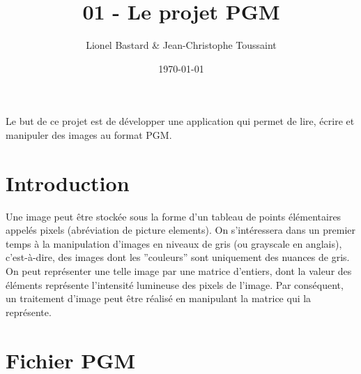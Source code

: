 \documentclass[a4paper, 10pt]{article}
\begin{document}
\title{01 - Le projet PGM}

\author{Lionel Bastard \& Jean-Christophe Toussaint\\
}
\date{\today}
 
\maketitle


Le but de ce projet est de développer une application qui permet de lire, écrire et manipuler des images au format PGM.


\section{Introduction}

Une image peut être stockée sous la forme d'un tableau de points élémentaires appelés pixels (abréviation de picture elements). On s'intéressera dans un premier temps à la manipulation d'images
 en niveaux de gris (ou grayscale en anglais), c’est-à-dire, des images dont les ''couleurs'' sont uniquement des nuances de gris. On peut représenter une telle image par une matrice d’entiers, dont la valeur des éléments représente l’intensité lumineuse des pixels de l’image. Par conséquent, un traitement d’image peut être réalisé en manipulant 
 la matrice qui la représente.
 
\section{Fichier PGM}
\end{document}
